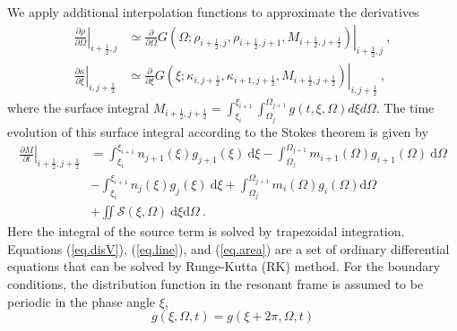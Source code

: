 We apply additional interpolation functions to approximate 
the derivatives
\begin{equation}
    \begin{aligned}
    \left.\frac{\partial \rho}{\partial \Omega}\right|_{i+\frac{1}{2},j}
    &\simeq \left.\frac{\partial}{\partial \Omega} G(\Omega;\rho_{i+\frac{1}{2},j},\rho_{i+\frac{1}{2},j+1}, M_{i+\frac{1}{2},j+\frac{1}{2}})\right|_{i+\frac{1}{2},j}~, \\
    \left.\frac{\partial \kappa}{\partial \xi}\right|_{i,j+\frac{1}{2}}
 &\simeq \left.\frac{\partial}{\partial \xi} G(\xi;\kappa_{i,j+\frac{1}{2}},\kappa_{i+1,j+\frac{1}{2}}, M_{i+\frac{1}{2},j+\frac{1}{2}})\right|_{i,j+\frac{1}{2}}~,
    \end{aligned}
\end{equation} 
where the surface integral $M_{i+\frac{1}{2},j+\frac{1}{2}}=\int_{\xi_i}^{\xi_{i+1}}\int_{\Omega_j}^{\Omega_{j+1}}g(t,\xi,\Omega)d\xi d\Omega$.
The time evolution of this surface integral according to the Stokes theorem is given by
\begin{equation}\label{eq.area}
    \begin{aligned}
         \left.\frac{\partial M}{\partial t}\right|_{i+\frac{1}{2},j+\frac{1}{2}}
         &= \int_{\xi_i}^{\xi_{i+1}} n_{j+1}(\xi) g_{j+1}(\xi)~\mathrm{d}\xi - \int_{\Omega_j}^{\Omega_{j+1}} m_{i+1}(\Omega) g_{i+1} (\Omega)~\mathrm{d} \Omega \\
        & - \int_{\xi_i}^{\xi_{i+1}} n_{j}(\xi) g_{j}(\xi)~\mathrm{d}\xi + \int_{\Omega_j}^{\Omega_{j+1}} m_{i}(\Omega) g_{i} (\Omega) \mathrm{d}\Omega \\
        &+ \iint \mathcal{S}(\xi,\Omega)~\mathrm{d}\xi\mathrm{d}\Omega~.
    \end{aligned}
\end{equation}
Here the integral of the source term is solved by trapezoidal integration.
Equations (\ref{eq.disV}), (\ref{eq.line}), and (\ref{eq.area})
are a set of ordinary differential equations that can be solved  by Runge-Kutta (RK) method.
For the boundary conditions, the distribution function 
in  the resonant frame
is assumed to be periodic in the phase angle $\xi$,
\begin{equation}
    g\left(\xi,\Omega,t\right)=g\left(\xi+2 \pi,\Omega,t\right)
\end{equation}
